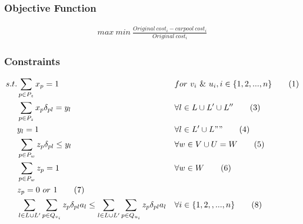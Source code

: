 \subsubsection*{Objective Function}

\begin{align*}
  max\ min\ \frac{Original\ cost_i - carpool\ cost_i}{Original\ cost_i}
\end{align*}

\subsubsection*{Constraints}

\begin{align*}
  s.t. & \sum\limits_{p \in P_z} x_p = 1 && for\ v_i \ \& \ u_i, i \in \{1,2,...,n\} \tag{1} \\
  & \sum\limits_{p \in P_z} x_p \delta_{pl} = y_l && \forall l \in L \cup L' \cup L'' \tag{3} \\
  & y_l = 1 && \forall l \in L' \cup L"" \tag{4} \\
  & \sum\limits_{p \in P_w} z_p \delta_{pl} \leq y_l && \forall w \in V \cup U = W \tag{5} \\
  & \sum\limits_{p \in P_w} z_p = 1 && \forall w \in W \tag{6} \\
  & z_p = 0 \ or \ 1 \tag{7} \\
  & \sum\limits_{l \in L \cup L'} \sum\limits_{p \in Q_{v_i}} z_p \delta_{pl} a_l \leq \sum\limits_{l \in L \cup L'} \sum\limits_{p \in Q_{u_i}} z_p \delta_{pl} a_l && \forall i \in \{1,2,,...,n\} \tag{8} \\
\end{align*}
